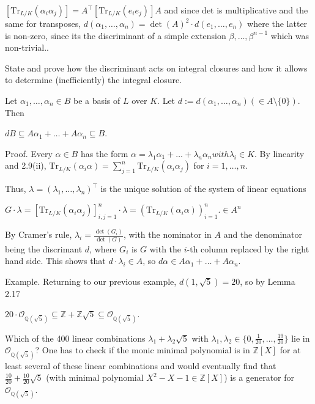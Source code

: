 \(\left[ \text{Tr}_{L/K} (\alpha_i \alpha_j) \right] = A^\top \left[ \text{Tr}_{L/K} (e_i e_j) \right] A\)
and since \( \text{det} \) is multiplicative and the same for transposes,
\(d(\alpha_1, \ldots, \alpha_n) = \det(A)^2 \cdot d(e_1, \ldots, e_n)\)
where the latter is non-zero, since its the discriminant of a simple extension \(\beta, \dots, \beta^{n-1}\) which was non-trivial.. 

State and prove how the discriminant acts on integral closures and how it allows
to determine (inefficiently) the integral closure.

Let \(\alpha_1, \ldots, \alpha_n \in B\) be a basis of \(L\) over \(K\). Let 
\(d := d(\alpha_1, \ldots, \alpha_n) (\in A \setminus \{0\})\). Then

\(dB \subseteq A\alpha_1 + \ldots + A\alpha_n \subseteq B.\)

Proof. 
Every \(\alpha \in B\) has the form \(\alpha = \lambda_1 \alpha_1 + \ldots + \lambda_n \alpha_n with \lambda_i \in K\). 
By linearity and 2.9(ii),
\(\text{Tr}_{L/K}(\alpha_i \alpha) = \sum_{j=1}^{n} \text{Tr}_{L/K}(\alpha_i \alpha_j)\)
for \(i = 1, \ldots, n\).

Thus, \(\lambda = (\lambda_1, \ldots, \lambda_n)^\top\) is the unique solution of the system of linear equations

\(G \cdot \lambda = \left[ \text{Tr}_{L/K}(\alpha_i \alpha_j) \right]_{i,j=1}^{n} \cdot \lambda = \left( \text{Tr}_{L/K}(\alpha_i \alpha) \right)_{i=1}^{n}. \in A^n\)


By Cramer’s rule, \(\lambda_i = \frac{\det(G_i)}{\det(G)}\), with the nominator in \( A \) and the denominator being the discrimant \( d \),
where \(G_i\) is \(G\) with the \(i\)-th column 
replaced by the right hand side. This shows that \(d \cdot \lambda_i \in A\), so \(d\alpha \in A\alpha_1 + \ldots + A\alpha_n\).

Example. Returning to our previous example, \(d(1, \sqrt{5}) = 20\), so by Lemma 2.17

\(20 \cdot \mathcal{O}_{\mathbb{Q}(\sqrt{5})} \subseteq \mathbb{Z} + \mathbb{Z}\sqrt{5} \subseteq \mathcal{O}_{\mathbb{Q}(\sqrt{5})}\).

Which of the 400 linear combinations \(\lambda_1 + \lambda_2 \sqrt{5}\) with 
\(\lambda_1, \lambda_2 \in \{0, \frac{1}{20}, \ldots, \frac{19}{20}\}\) lie in \(\mathcal{O}_{\mathbb{Q}(\sqrt{5})}\)? 
One has to check if the monic minimal polynomial is in \(\mathbb{Z}[X]\) for at least several of these linear combinations and 
would eventually find that \(\frac{10}{20} + \frac{10}{20} \sqrt{5}\) (with minimal polynomial \(X^2 - X - 1 \in \mathbb{Z}[X]\)) 
is a generator for \(\mathcal{O}_{\mathbb{Q}(\sqrt{5})}\).


